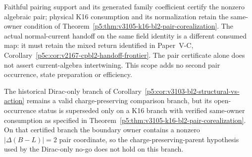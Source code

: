\documentclass[12pt,a4paper]{article}
\begin{document}
\begin{remark}
\label{p5:rem:v2167-pair-current-scope}
Faithful pairing support and its generated family coefficient certify the
nonzero algebraic pair; physical K16 consumption and its normalization
retain the same-owner condition of Theorem~\ref{p5:thm:v3105-k16-bl2-pair-corealization}. The actual normal-current handoff on the same field identity
is a different consumed map: it must retain the mixed return identified in
Paper~V-C, Corollary~\ref{p5c:cor:v2167-cpbl2-handoff-frontier}.
The pair certificate alone does not assert current-algebra intertwining.
This scope adds no second pair occurrence, state preparation or efficiency.
\end{remark}


\begin{corollary}
\label{p5:cor:v3105-bl2-dirac-no-go-scope}
The historical Dirac-only branch of
Corollary~\ref{p5:cor:v3103-bl2-structural-vs-action} remains a valid
charge-preserving comparison branch, but its open-occurrence status is superseded only on a K16 branch with
verified same-owner consumption as specified in
Theorem~\ref{p5:thm:v3105-k16-bl2-pair-corealization}.  On that certified branch the boundary
owner contains a nonzero $|\Delta(B-L)|=2$ pair coordinate, so the
charge-preserving-parent hypothesis used by the Dirac-only no-go does not hold
on this branch.
\end{corollary}
\end{document}
